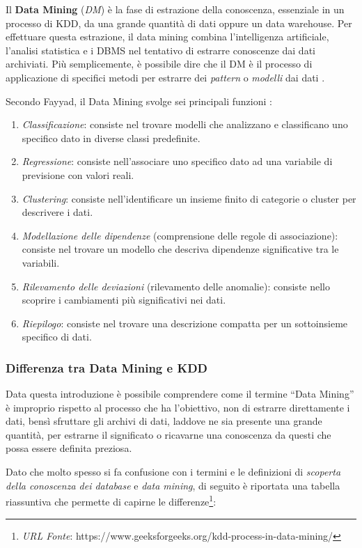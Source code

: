 Il \textbf{Data Mining} (\textit{DM}) è la fase di estrazione della conoscenza, essenziale in un processo di KDD, da una grande quantità di dati oppure un data warehouse. Per effettuare questa estrazione, il data mining combina l'intelligenza artificiale, l'analisi statistica e i DBMS nel tentativo di estrarre conoscenze dai dati archiviati. Più semplicemente, è possibile dire che il DM è il processo di applicazione di specifici metodi per estrarre dei \textit{pattern} o \textit{modelli} dai dati \cite{citeseerx_data_mining}.

Secondo Fayyad, il Data Mining svolge sei principali funzioni \cite{aircconline_data_mining}:

\begin{enumerate}
    \item \textit{Classificazione}: consiste nel trovare modelli che analizzano e classificano uno specifico dato in diverse classi predefinite.
    \item \textit{Regressione}: consiste nell'associare uno specifico dato ad una variabile di previsione con valori reali.
    \item \textit{Clustering}: consiste nell'identificare un insieme finito di categorie o cluster per descrivere i dati.
    \item \textit{Modellazione delle dipendenze} (comprensione delle regole di associazione): consiste nel trovare un modello che descriva dipendenze significative tra le variabili.
    \item \textit{Rilevamento delle deviazioni} (rilevamento delle anomalie): consiste nello scoprire i cambiamenti più significativi nei dati.
    \item \textit{Riepilogo}: consiste nel trovare una descrizione compatta per un sottoinsieme specifico di dati.
\end{enumerate}

\subsubsection{Differenza tra Data Mining e KDD}

Data questa introduzione è possibile comprendere come il termine “Data Mining” è improprio rispetto al processo che ha l'obiettivo, non di estrarre direttamente i dati, bensì sfruttare gli archivi di dati, laddove ne sia presente una grande quantità, per estrarne il significato o ricavarne una conoscenza da questi che possa essere definita preziosa.

Dato che molto spesso si fa confusione con i termini e le definizioni di \textit{scoperta della conoscenza dei database} e \textit{data mining}, di seguito è riportata una tabella riassuntiva che permette di capirne le differenze\footnote{\textit{URL Fonte}: https://www.geeksforgeeks.org/kdd-process-in-data-mining/}:

